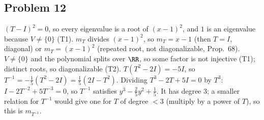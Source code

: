 \documentclass[10pt]{scrartcl}
\begin{document}
\subsection*{Problem 12}
\begin{enumerate}[(a)]
  \ii $(T-I)^2=0$, so every eigenvalue is a root of $(x-1)^2$, and $1$ is an eigenvalue because $V\ne\{0\}$ (T1). $m_T$ divides $(x-1)^2$, so $m_T=x-1$ (then $T=I$, diagonal) or $m_T=(x-1)^2$ (repeated root, not diagonalizable, Prop.~68).
  \ii $V\ne\{0\}$ and the polynomial splits over $\RR$, so some factor is not injective (T1); distinct roots, so diagonalizable (T2).
  \ii $T(T^2-2I)=-5I$, so $T^{-1}=-\tfrac15(T^2-2I)=\tfrac15(2I-T^2)$. Dividing $T^3-2T+5I=0$ by $T^3$: $I-2T^{-2}+5T^{-3}=0$, so $T^{-1}$ satisfies $y^3-\tfrac25y^2+\tfrac15$. It has degree $3$; a smaller relation for $T^{-1}$ would give one for $T$ of degree $<3$ (multiply by a power of $T$), so this is $m_{T^{-1}}$.
\end{enumerate}
\end{document}
